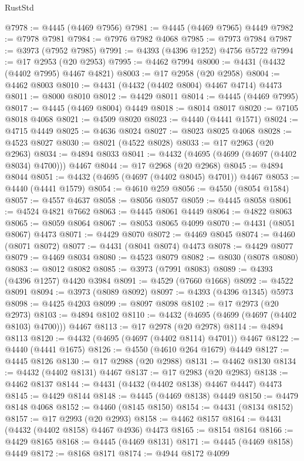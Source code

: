 \begin{lexlean}{RustStd}
\begin{coremodule}
@7978 := @4445 (@4469 @7956)
@7981 := @4445 (@4469 @7965) @4449
@7982 := @7978 @7981
@7984 := @7976 @7982 @4068
@7985 := @7973 @7984
@7987 := @3973 (@7952 @7985)
@7991 := @4393 (@4396 @1252) @4756 @5722
@7994 := @17 @2953 (@20 @2953)
@7995 := @4462 @7994
@8000 := @4431 (@4432 (@4402 @7995) @4467 @4821)
@8003 := @17 @2958 (@20 @2958)
@8004 := @4462 @8003
@8010 := @4431 (@4432 (@4402 @8004) @4467 @4714) @4473
@8011 := @8000 @8010
@8012 := @4429 @8011
@8014 := @4445 (@4469 @7995)
@8017 := @4445 (@4469 @8004) @4449
@8018 := @8014 @8017
@8020 := @7105 @8018 @4068
@8021 := @4509 @8020
@8023 := @4440 (@4441 @1571)
@8024 := @4715 @4449
@8025 := @4636 @8024
@8027 := @8023 @8025 @4068
@8028 := @4523 @8027
@8030 := @8021 (@4522 @8028)
@8033 := @17 @2963 (@20 @2963)
@8034 := @4894 @8033
@8041 := @4432 (@4695 (@4699 (@4697 (@4402 @8034) @4700))) @4467
@8044 := @17 @2968 (@20 @2968)
@8045 := @4894 @8044
@8051 := @4432 (@4695 (@4697 (@4402 @8045) @4701)) @4467
@8053 := @4440 (@4441 @1579)
@8054 := @4610 @259
@8056 := @4550 (@8054 @1584)
@8057 := @4557 @4637
@8058 := @8056 @8057
@8059 := @4445 @8058
@8061 := @4524 @4821 @7662
@8063 := @4445 @8061 @4449
@8064 := @4822 @8063
@8065 := @8059 @8064
@8067 := @8053 @8065 @4099
@8070 := @4431 (@8051 @8067) @4473
@8071 := @4429 @8070
@8072 := @4469 @8045
@8074 := @4460 (@8071 @8072)
@8077 := @4431 (@8041 @8074) @4473
@8078 := @4429 @8077
@8079 := @4469 @8034
@8080 := @4523 @8079
@8082 := @8030 (@8078 @8080)
@8083 := @8012 @8082
@8085 := @3973 (@7991 @8083)
@8089 := @4393 (@4396 @1257) @4420 @3984
@8091 := @4529 (@7660 @1668)
@8092 := @4522 @8091
@8094 := @3973 (@8089 @8092)
@8097 := @4393 (@4396 @1345) @5973
@8098 := @4425 @4203
@8099 := @8097 @8098
@8102 := @17 @2973 (@20 @2973)
@8103 := @4894 @8102
@8110 := @4432 (@4695 (@4699 (@4697 (@4402 @8103) @4700))) @4467
@8113 := @17 @2978 (@20 @2978)
@8114 := @4894 @8113
@8120 := @4432 (@4695 (@4697 (@4402 @8114) @4701)) @4467
@8122 := @4440 (@4441 @1675)
@8126 := @4550 (@4610 @264 @1679) @4449
@8127 := @4445 @8126
@8130 := @17 @2988 (@20 @2988)
@8131 := @4462 @8130
@8134 := @4432 (@4402 @8131) @4467
@8137 := @17 @2983 (@20 @2983)
@8138 := @4462 @8137
@8144 := @4431 (@4432 (@4402 @8138) @4467 @4447) @4473
@8145 := @4429 @8144
@8148 := @4445 (@4469 @8138) @4449
@8150 := @4479 @8148 @4068
@8152 := @4460 (@8145 @8150)
@8154 := @4431 (@8134 @8152)
@8157 := @17 @2993 (@20 @2993)
@8158 := @4462 @8157
@8164 := @4431 (@4432 (@4402 @8158) @4467 @4936) @4473
@8165 := @8154 @8164
@8166 := @4429 @8165
@8168 := @4445 (@4469 @8131)
@8171 := @4445 (@4469 @8158) @4449
@8172 := @8168 @8171
@8174 := @4944 @8172 @4099

\end{coremodule}
\end{lexlean}
